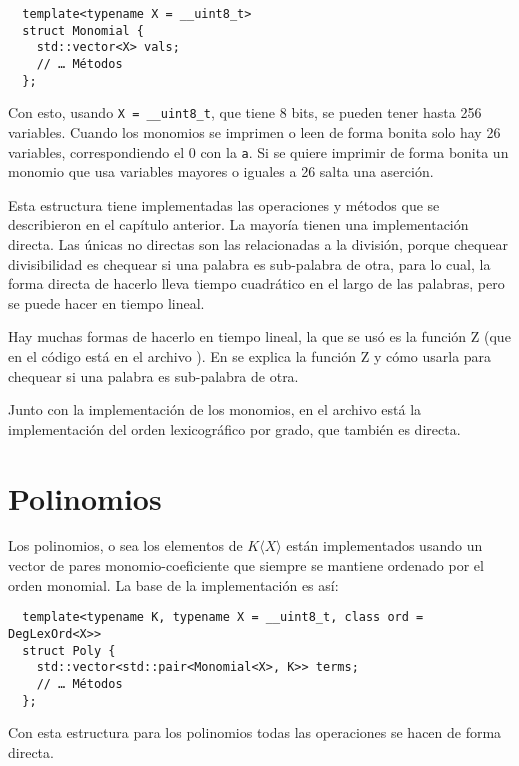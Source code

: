 \documentclass[12pt]{report}
\theoremstyle{customstyle}
\theoremstyle{factstyle}
\begin{document}
\begin{verbatim}
  template<typename X = __uint8_t>
  struct Monomial {
    std::vector<X> vals;
    // … Métodos
  };
\end{verbatim}

Con esto, usando \texttt{X = \_\_uint8\_t}, que tiene 8 bits, se pueden tener hasta 256 variables. Cuando los monomios se imprimen o leen de forma bonita solo hay 26 variables, correspondiendo el 0 con la \texttt{a}. Si se quiere imprimir de forma bonita un monomio que usa variables mayores o iguales a 26 salta una aserción.

Esta estructura tiene implementadas las operaciones y métodos que se describieron en el capítulo anterior. La mayoría tienen una implementación directa. Las únicas no directas son las relacionadas a la división, porque chequear divisibilidad es chequear si una palabra es sub-palabra de otra, para lo cual, la forma directa de hacerlo lleva tiempo cuadrático en el largo de las palabras, pero se puede hacer en tiempo lineal.

Hay muchas formas de hacerlo en tiempo lineal, la que se usó es la función Z (que en el código está en el archivo ). En \cite{web:cp-algo:Zfunc} se explica la función Z y cómo usarla para chequear si una palabra es sub-palabra de otra.

Junto con la implementación de los monomios, en el archivo  está la implementación del orden lexicográfico por grado, que también es directa.

\section{Polinomios}

Los polinomios, o sea los elementos de $K⟨X⟩$ están implementados usando un vector de pares monomio-coeficiente que siempre se mantiene ordenado por el orden monomial. La base de la implementación es así:

\begin{verbatim}
  template<typename K, typename X = __uint8_t, class ord = DegLexOrd<X>>
  struct Poly {
    std::vector<std::pair<Monomial<X>, K>> terms;
    // … Métodos
  };
\end{verbatim}

Con esta estructura para los polinomios todas las operaciones se hacen de forma directa.
\end{document}
